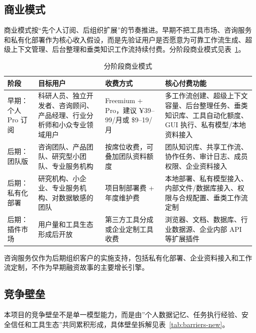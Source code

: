\documentclass[12pt,a4paper]{ctexart}
\begin{document}
\subsection{商业模式}

商业模式按“先个人订阅、后组织扩展”的节奏推进。早期不把工具市场、咨询服务和私有化部署作为核心收入假设，而是先验证用户是否愿意为可靠工作流生成、超级上下文管理、后台整理和垂类知识工作流持续付费。分阶段商业模式见表~\ref{tab:business-model-stages}。

\begin{table}[htbp]
  \centering
  \small
  \begin{tabularx}{\textwidth}{p{2.6cm} X X X}
    \toprule
    \textbf{阶段} & \textbf{目标用户} & \textbf{收费方式} & \textbf{核心付费功能} \\
    \midrule
    早期：个人 Pro 订阅 & 科研人员、独立开发者、咨询顾问、产品经理、行业分析师和小众专业领域用户 & Freemium + Pro，建议 ¥39--99/月或 \$9--19/月 & 多工作流创建、超级上下文容量、后台整理任务、垂类知识库、工具自动化额度、GUI 执行、私有模型/本地资料接入 \\
    后期：团队版 & 咨询团队、产品团队、研究型小团队、专业服务机构 & 按席位收费，可叠加团队资料额度 & 团队知识库、共享工作流、协作任务、审计日志、成员权限、企业资料接入 \\
    后期：私有化部署 & 研究机构、小企业、专业服务机构、对数据敏感的团队 & 项目制部署费 + 年度维护费 & 本地部署、私有模型接入、内部文件/数据库接入、权限与合规配置、垂类工作流定制 \\
    后期：插件市场 & 用户量和工具生态形成后开放 & 第三方工具分成或企业定制工具收费 & 浏览器、文档、数据库、行业数据源、企业内部 API 等扩展插件 \\
    \bottomrule
  \end{tabularx}
  \caption{分阶段商业模式}
  \label{tab:business-model-stages}
\end{table}

咨询服务仅作为后期组织客户的实施支持，包括私有化部署、企业资料接入和工作流定制，不作为早期融资故事的主要增长引擎。

\subsection{竞争壁垒}

本项目的竞争壁垒不是单一模型能力，而是由”个人数据记忆、任务执行经验、安全信任和工具生态”共同累积形成，具体壁垒拆解见表~\ref{tab:barriers-new}。
\end{document}
